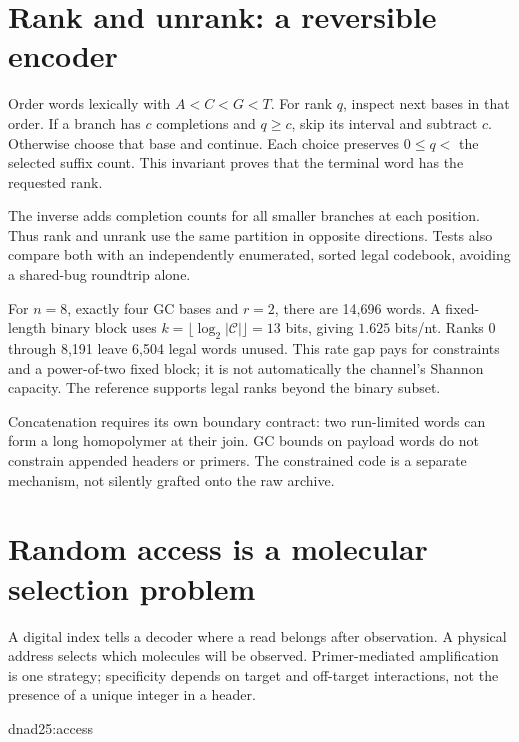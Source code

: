 \section{Rank and unrank: a reversible encoder}
Order words lexically with $A<C<G<T$. For rank $q$, inspect next bases in
that order. If a branch has $c$ completions and $q\geq c$,
skip its interval and subtract $c$. Otherwise choose that base and continue.
Each choice preserves $0\leq q<$ the selected suffix count.
This invariant proves that the terminal word has the requested rank.

The inverse adds completion counts for all smaller branches at each position.
Thus rank and unrank use the same partition in opposite directions.
Tests also compare both with an independently enumerated, sorted legal
codebook, avoiding a shared-bug roundtrip alone.


For $n=8$, exactly four GC bases and $r=2$, there are 14,696 words.
A fixed-length binary block uses
$k=\lfloor\log_2|\mathcal C|\rfloor=13$ bits, giving $1.625$ bits/nt.
Ranks 0 through 8,191 leave 6,504 legal words unused.
This rate gap pays for constraints and a power-of-two fixed block;
it is not automatically the channel's Shannon capacity.
The reference supports legal ranks beyond the binary subset.

\par\medskip\noindent\par\medskip
Concatenation requires its own boundary contract: two run-limited words
can form a long homopolymer at their join. GC bounds on payload words do not
constrain appended headers or primers. The constrained code is a separate
mechanism, not silently grafted onto the raw archive.

\section{Random access is a molecular selection problem}
A digital index tells a decoder where a read belongs after observation.
A physical address selects which molecules will be observed.
Primer-mediated amplification is one strategy; specificity depends
on target and off-target interactions, not the presence of a unique
integer in a header.

{dnad25:access}

